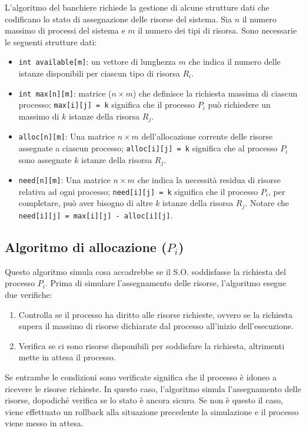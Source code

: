\documentclass[a4paper,12pt, twoside]{report}
\begin{document}
L'algoritmo del banchiere richiede la gestione di alcune strutture dati che codificano lo stato di assegnazione delle risorse del sistema. Sia $n$ il numero massimo di processi del sistema e $m$ il numero dei tipi di risorsa. Sono necessarie le seguenti strutture dati:
\begin{center}
\begin{itemize}
\item \texttt{int available[m]}: un vettore di lunghezza $m$ che indica il numero delle istanze disponibili per ciascun tipo di risorsa $R_i$.
\item \texttt{int max[n][m]}: matrice ($n \times m$) che definisce la richiesta massima di ciascun processo; \texttt{max[i][j] = k} significa che il processo $P_i$ pu\`o richiedere un massimo di $k$ istanze della risorsa $R_j$.
\item \texttt{alloc[n][m]}: Una matrice $n \times m$ dell'allocazione corrente delle risorse assegnate a ciascun processo; \texttt{alloc[i][j] = k} significa che al processo $P_i$ sono assegnate $k$ istanze della risorsa $R_j$.
\item \texttt{need[n][m]}: Una matrice $n \times m$ che indica la necessit\`a residua di risorse relativa ad ogni processo; \texttt{need[i][j] = k} significa che il processo $P_i$, per completare, pu\`o aver bisogno di altre $k$ istanze della risorsa $R_j$. Notare che \texttt{need[i][j] = max[i][j] - alloc[i][j]}.
\end{itemize}
\end{center}

\subsection{Algoritmo di allocazione ($P_i$)}

Questo algoritmo simula cosa accadrebbe se il S.O. soddisfasse la richiesta del processo $P_i$. Prima di simulare l'assegnamento delle risorse, l'algoritmo esegue due verifiche:
\begin{enumerate}
\item Controlla se il processo ha diritto alle risorse richieste, ovvero se la richiesta supera il massimo di risorse dichiarate dal processo all'inizio dell'esecuzione.
\item Verifica se ci sono risorse disponibili per soddisfare la richiesta, altrimenti mette in attesa il processo.
\end{enumerate} 

Se entrambe le condizioni sono verificate significa che il processo \`e idoneo a ricevere le risorse richieste. In questo caso, l'algoritmo simula l'assegnamento delle risorse, dopodich\'e verifica se lo stato \`e ancora sicuro. Se non \`e questo il caso, viene effettuato un rollback alla situazione precedente la simulazione e il processo viene messo in attesa.
\end{document}

